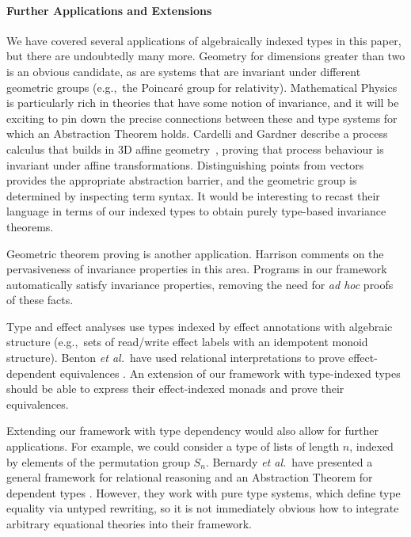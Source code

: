 \documentclass{sigplanconf}
\theoremstyle{examplestyle}
\theoremstyle{restatementstyle}
\begin{document}
\paragraph{Further Applications and Extensions} We have covered
several applications of algebraically indexed types in this paper, but
there are undoubtedly many more. Geometry for dimensions greater than
two is an obvious candidate, as are systems that are invariant
under different geometric groups (e.g.,~the Poincar\'{e} group for
relativity). Mathematical Physics is particularly rich in theories
that have some notion of invariance, and it will be exciting to pin
down the precise connections between these and type systems for which
an Abstraction Theorem holds. 
Cardelli and Gardner describe a process calculus that builds in 3D affine geometry~\cite{Cardelli},
proving that process behaviour is invariant under affine transformations. Distinguishing points from vectors
provides the appropriate abstraction barrier, and the geometric group is determined by inspecting
term syntax. It would be interesting to recast their language in terms of our indexed types to
obtain purely type-based invariance theorems.

Geometric theorem
proving is another %
application. Harrison
\cite{harrison09without} comments on the pervasiveness of %
invariance properties in this area. Programs in our framework
automatically satisfy invariance properties, removing the need for
{\em ad hoc} proofs of these facts.


Type and effect analyses use types indexed by effect annotations with
algebraic structure (e.g.,~sets of read/write effect labels with an
idempotent monoid structure). Benton {\em et al.}~have used relational
interpretations to prove effect-dependent equivalences
\cite{benton06reading}. An extension of our framework with
type-indexed types should be able to express their effect-indexed monads
and prove their equivalences.

Extending our framework with type dependency would also allow for
further applications. For example, we could consider a type of lists
of length $n$, indexed by elements of the permutation group
$S_n$. Bernardy {\em et al.}~have presented a general framework for
relational reasoning and an Abstraction Theorem for dependent types
\cite{bernardy12proofs}. However, they work with pure type systems,
which define type equality via untyped rewriting, so it is not
immediately obvious how to integrate arbitrary equational theories
into their framework.
\end{document}
